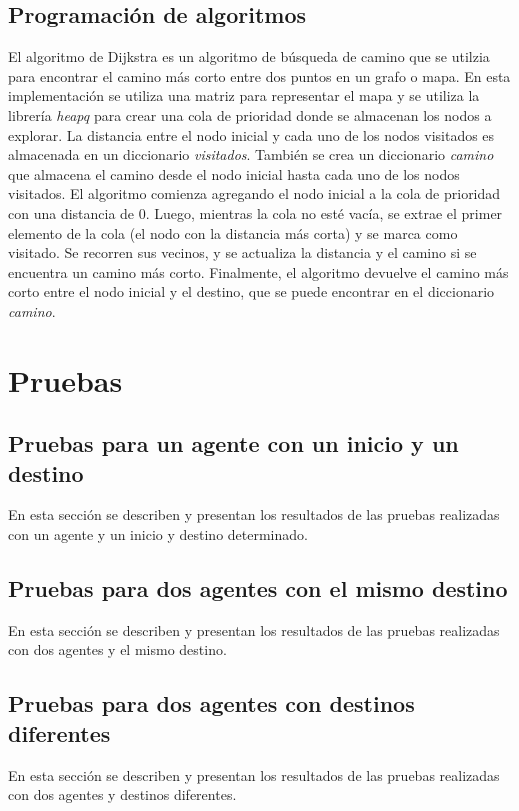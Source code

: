\documentclass[12pt,a4paper]{article}
\begin{document}
\subsection{Programación de algoritmos}
El algoritmo de Dijkstra es un algoritmo de búsqueda de camino que se utilzia para encontrar el camino 
más corto entre dos puntos en un grafo o mapa. En esta implementación se utiliza una matriz para 
representar el mapa y se utiliza la librería \textit{heapq} para crear una cola de prioridad donde se 
almacenan los nodos a explorar. La distancia entre el nodo inicial y cada uno de los nodos visitados 
es almacenada en un diccionario \textit{visitados}. También se crea un diccionario \textit{camino} que almacena el 
camino desde el nodo inicial hasta cada uno de los nodos visitados.
El algoritmo comienza agregando el nodo inicial a la cola de prioridad con una distancia de 0. Luego, 
mientras la cola no esté vacía, se extrae el primer elemento de la cola (el nodo con la distancia más 
corta) y se marca como visitado.
Se recorren sus vecinos, y se actualiza la distancia y el camino si se encuentra 
un camino más corto.
Finalmente, el algoritmo devuelve el camino más corto entre el nodo inicial y 
el destino, que se puede encontrar en el diccionario \textit{camino}.
\section{Pruebas}
\subsection{Pruebas para un agente con un inicio y un destino}
En esta sección se describen y presentan los resultados de las pruebas realizadas con un agente y un inicio y destino determinado.

\subsection{Pruebas para dos agentes con el mismo destino}
En esta sección se describen y presentan los resultados de las pruebas realizadas con dos agentes y el mismo destino.

\subsection{Pruebas para dos agentes con destinos diferentes}
En esta sección se describen y presentan los resultados de las pruebas realizadas con dos agentes y destinos diferentes.
\end{document}
